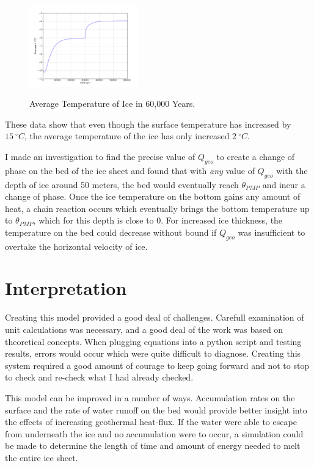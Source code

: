 \documentclass{article}%
\begin{document}
\begin{figure}[H]
	\centering
		\includegraphics[width=0.42\textwidth]{images/60000yr_avg.png}
	\label{fig:500 year orbit}
	\caption{Average Temperature of Ice in 60,000 Years.}
\end{figure}

\noindent These data show that even though the surface temperature has increased by $15\ ^\circ C$, the average temperature of the ice has only increased $2\ ^\circ C$.

I made an investigation to find the precise value of $Q_{geo}$ to create a change of phase on the bed of the ice sheet and found that with \emph{any} value of $Q_{geo}$ with the depth of ice around 50 meters, the bed would eventually reach $\theta_{PMP}$ and incur a change of phase.  Once the ice temperature on the bottom gains any amount of heat, a chain reaction occurs which eventually brings the bottom temperature up to $\theta_{PMP}$, which for this depth is close to 0.  For increased ice thickness, the temperature on the bed could decrease without bound if $Q_{geo}$ was insufficient to overtake the horizontal velocity of ice.


\section{Interpretation}
Creating this model provided a good deal of challenges.  Carefull examination of unit calculations was necessary, and a good deal of the work was based on theoretical concepts.  When plugging equations into a python script and testing results, errors would occur which were quite difficult to diagnose.  Creating this system required a good amount of courage to keep going forward and not to stop to check and re-check what I had already checked.

This model can be improved in a number of ways.  Accumulation rates on the surface and the rate of water runoff on the bed would provide better insight into the effects of increasing geothermal heat-flux.  If the water were able to escape from underneath the ice and no accumulation were to occur, a simulation could be made to determine the length of time and amount of energy needed to melt the entire ice sheet.
\end{document}
